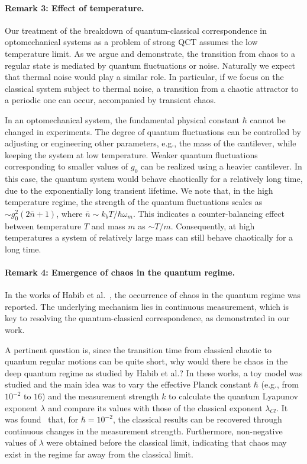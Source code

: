 \documentclass[12pt]{wlscirep}
\begin{document}
\paragraph*{Remark 3: Effect of temperature.}
Our treatment of the breakdown of quantum-classical correspondence in 
optomechanical systems as a problem of strong QCT assumes the low 
temperature limit. As we argue and demonstrate, the transition from chaos
to a regular state is mediated by quantum fluctuations or noise. Naturally
we expect that thermal noise would play a similar role. In particular, if
we focus on the classical system subject to thermal noise, a transition 
from a chaotic attractor to a periodic one can occur, accompanied by
transient chaos. 

In an optomechanical system, the fundamental physical constant $\hbar$
cannot be changed in experiments. The degree of quantum fluctuations can
be controlled by adjusting or engineering other parameters, e.g., the mass
of the cantilever, while keeping the system at low temperature. Weaker 
quantum fluctuations corresponding to smaller values of $g_0$ can be 
realized using a heavier cantilever. In this case, the quantum system 
would behave chaotically for a relatively long time, due to the exponentially
long transient lifetime. We note that, in the high temperature regime,  
the strength of the quantum fluctuations scales as $\sim g_0^2(2\bar{n}+1)$, 
where $\bar{n} \sim  k_bT/\hbar\omega_m$. This indicates a 
counter-balancing effect between temperature $T$ and mass $m$ as $\sim T/m$. 
Consequently, at high temperatures a system of relatively large mass can 
still behave chaotically for a long time. 

\paragraph*{Remark 4: Emergence of chaos in the quantum regime.}
In the works of Habib et al.~\cite{GADBH:2004,HJS:2006}, the occurrence 
of chaos in the quantum regime was reported. The underlying mechanism
lies in continuous measurement, which is key to resolving the 
quantum-classical correspondence, as demonstrated in our work.
 
A pertinent question is, since the transition time from classical chaotic 
to quantum regular motions can be quite short, why would there be chaos in 
the deep quantum regime as studied by Habib et al.? In these works, a toy 
model was studied and the main idea was to vary the effective Planck 
constant $\hbar$ (e.g., from $10^{-2}$ to $16$) and the measurement 
strength $k$ to calculate the quantum Lyapunov exponent $\lambda$
and compare its values with those of the classical exponent $\lambda_{Cl}$.
It was found~\cite{GADBH:2004,HJS:2006} that, for $\hbar=10^{-2}$, the 
classical results can be recovered through continuous changes in the 
measurement strength. Furthermore, non-negative values of $\lambda$ were 
obtained before the classical limit, indicating that chaos may exist in the 
regime far away from the classical limit. 
\end{document}
